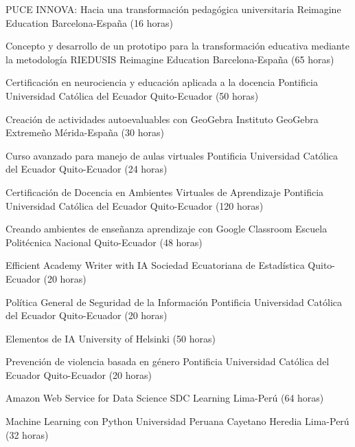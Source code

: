 \documentclass[
	a4paper,
	maincolor=cvblue!70!blue,
	sidecolor=gray!30,
	sectioncolor=cvblue!70!blue,
    sidebarwidth=7.5cm,
	topbottommargin=20pt,
	leftrightmargin=20pt,
]{fortysecondscv}
\begin{document}
    {PUCE INNOVA: Hacia una transformación pedagógica universitaria}
    {Reimagine Education}
    {Barcelona-España (16 horas)}

    {Concepto y desarrollo de un prototipo para la transformación educativa mediante la metodología RIEDUSIS}
    {Reimagine Education}
    {Barcelona-España (65 horas)}

    {Certificación en neurociencia y educación aplicada a la docencia}
    {Pontificia Universidad Católica del Ecuador}
    {Quito-Ecuador (50 horas)}

    {Creación de actividades autoevaluables con GeoGebra}
    {Instituto GeoGebra Extremeño}
    {Mérida-España (30 horas)}

    {Curso avanzado para manejo de aulas virtuales}
    {Pontificia Universidad Católica del Ecuador}
    {Quito-Ecuador (24 horas)}

    {Certificación de Docencia en Ambientes Virtuales de Aprendizaje}
    {Pontificia Universidad Católica del Ecuador}
    {Quito-Ecuador (120 horas)}

    {Creando ambientes de enseñanza aprendizaje con Google Classroom}
    {Escuela Politécnica Nacional}
    {Quito-Ecuador (48 horas)}



    {Efficient Academy Writer with IA}
    {Sociedad Ecuatoriana de Estadística}
    {Quito-Ecuador (20 horas)}

    {Política General de Seguridad de la Información}
    {Pontificia Universidad Católica del Ecuador}
    {Quito-Ecuador (20 horas)}

    {Elementos de IA}
    {University of Helsinki}
    {(50 horas)}

    {Prevención de violencia basada en género}
    {Pontificia Universidad Católica del Ecuador}
    {Quito-Ecuador (20 horas)}

    {Amazon Web Service for Data Science}
    {SDC Learning}
    {Lima-Perú (64 horas)}

    {Machine Learning con Python}
    {Universidad Peruana Cayetano Heredia}
    {Lima-Perú (32 horas)}
\end{document}
